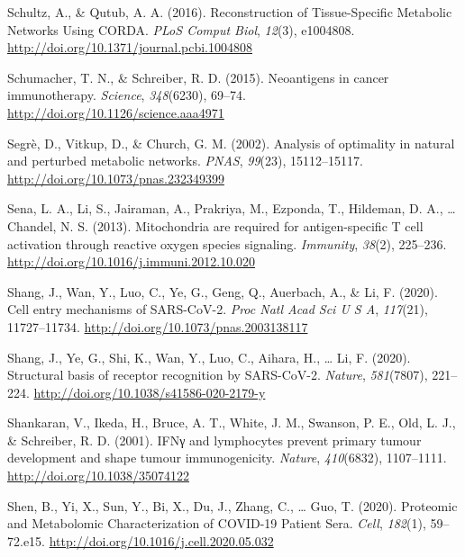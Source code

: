 \documentclass[12pt,twoside,openany,\mydriver]{thesis}  %
\begin{document}
\leavevmode\hypertarget{ref-schultz_reconstruction_2016}{}%
Schultz, A., \& Qutub, A. A. (2016). Reconstruction of Tissue-Specific Metabolic Networks Using CORDA. \emph{PLoS Comput Biol}, \emph{12}(3), e1004808. \url{http://doi.org/10.1371/journal.pcbi.1004808}

\leavevmode\hypertarget{ref-schumacher_neoantigens_2015}{}%
Schumacher, T. N., \& Schreiber, R. D. (2015). Neoantigens in cancer immunotherapy. \emph{Science}, \emph{348}(6230), 69--74. \url{http://doi.org/10.1126/science.aaa4971}

\leavevmode\hypertarget{ref-segre_analysis_2002}{}%
Segrè, D., Vitkup, D., \& Church, G. M. (2002). Analysis of optimality in natural and perturbed metabolic networks. \emph{PNAS}, \emph{99}(23), 15112--15117. \url{http://doi.org/10.1073/pnas.232349399}

\leavevmode\hypertarget{ref-sena_mitochondria_2013}{}%
Sena, L. A., Li, S., Jairaman, A., Prakriya, M., Ezponda, T., Hildeman, D. A., \ldots{} Chandel, N. S. (2013). Mitochondria are required for antigen-specific T cell activation through reactive oxygen species signaling. \emph{Immunity}, \emph{38}(2), 225--236. \url{http://doi.org/10.1016/j.immuni.2012.10.020}

\leavevmode\hypertarget{ref-shang_cell_2020}{}%
Shang, J., Wan, Y., Luo, C., Ye, G., Geng, Q., Auerbach, A., \& Li, F. (2020). Cell entry mechanisms of SARS-CoV-2. \emph{Proc Natl Acad Sci U S A}, \emph{117}(21), 11727--11734. \url{http://doi.org/10.1073/pnas.2003138117}

\leavevmode\hypertarget{ref-shang_structural_2020}{}%
Shang, J., Ye, G., Shi, K., Wan, Y., Luo, C., Aihara, H., \ldots{} Li, F. (2020). Structural basis of receptor recognition by SARS-CoV-2. \emph{Nature}, \emph{581}(7807), 221--224. \url{http://doi.org/10.1038/s41586-020-2179-y}

\leavevmode\hypertarget{ref-shankaran_ifn_2001}{}%
Shankaran, V., Ikeda, H., Bruce, A. T., White, J. M., Swanson, P. E., Old, L. J., \& Schreiber, R. D. (2001). IFNγ and lymphocytes prevent primary tumour development and shape tumour immunogenicity. \emph{Nature}, \emph{410}(6832), 1107--1111. \url{http://doi.org/10.1038/35074122}

\leavevmode\hypertarget{ref-shen_proteomic_2020}{}%
Shen, B., Yi, X., Sun, Y., Bi, X., Du, J., Zhang, C., \ldots{} Guo, T. (2020). Proteomic and Metabolomic Characterization of COVID-19 Patient Sera. \emph{Cell}, \emph{182}(1), 59--72.e15. \url{http://doi.org/10.1016/j.cell.2020.05.032}
\end{document}

